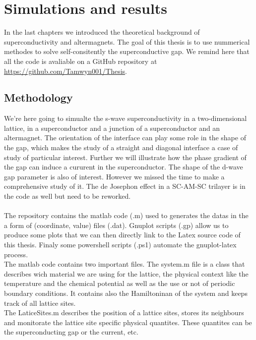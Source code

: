 \documentclass[../main.tex]{subfile}
\begin{document}
\section{Simulations and results}
In the last chapters we introduced the theoretical background of superconductivity and altermagnets. 
The goal of this thesis is to use nummerical methodes to solve self-consitently the superconductive gap.
We remind here that all the code is avaliable on a GitHub repository at \url{https://github.com/Tamwyn001/Thesis}.\\

\subsection{Methodology}
We're here going to simualte the s-wave superconductivity in a two-dimensional lattice,
in a superconductor and a junction of a superconductor and an altermagnet. 
The orientation of the interface can play some role in the shape of the gap, which 
makes the study of a straight and diagonal interface a case of study of particular interest. 
Further we will illustrate how the phase gradient of the gap can induce a cururent in the superconductor.
The shape of the d-wave gap parameter is also of interest. However we missed the time to make a comprehensive study of it.
The de Josephon effect in a SC-AM-SC trilayer is in the code as well but need to be reworked.\\
\\    

The repository contains the matlab code (.m) used to generates the datas in the a form of (coordinate, value) files (.dat).
Gnuplot scripts (.gp) allow us to produce some plots that we can then directly link to the Latex source code
of this thesis. Finaly some powershell scripts (.ps1) automate the gnuplot-latex process.\\

The matlab code contains two important files. The system.m file is a class that describes wich
 material we are using for the lattice, the physical context like the temperature and the chemical potential
as well as the use or not of periodic boundary conditions. It contains also the Hamiltoninan of the system
and keeps track of all lattice sites.\\
The LaticeSites.m describes the position of a lattice sites, stores its neighbours and monitorate the lattice
site specific physical quantites. These quantites can be the superconducting gap or the current, etc.\\
\end{document}
